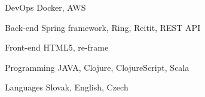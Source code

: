 

\begin{cvskills}

  \cvskill
    {DevOps} %
    {Docker, AWS} %

  \cvskill
    {Back-end} %
    {Spring framework, Ring, Reitit, REST API} %

  \cvskill
    {Front-end} %
    {HTML5, re-frame} %

  \cvskill
    {Programming} %
    {JAVA, Clojure, ClojureScript, Scala} %

  \cvskill
    {Languages} %
    {Slovak, English, Czech} %

\end{cvskills}
